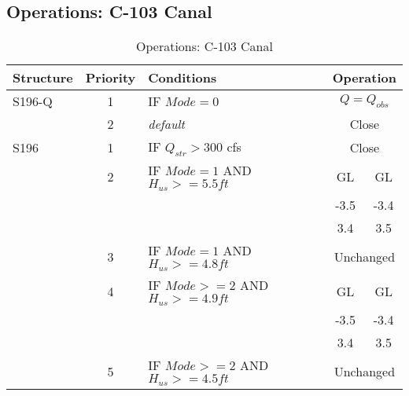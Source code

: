 \clearpage

\subsection{Operations: C-103 Canal}

\scriptsize
\begin{table}[!h]
\centering
\caption{Operations: C-103 Canal}
\label{tab:M11opsC103}
\begin{tabular}{|l|c|l|c|c|}
\hline
\textbf{Structure} & \textbf{Priority}  & \textbf{Conditions} & \multicolumn{2}{|c|}{\textbf{Operation}}   \\
\hline
\hline
S196-Q        &  1  & IF $Mode=0$                   & \multicolumn{2}{|c|}{$Q = Q_{obs}$}   \\
\hline
              &  2  & \it{default}                  & \multicolumn{2}{|c|}{Close}           \\
\hline
\hline
S196          &  1  & IF $Q_{str}>300$ cfs                               & \multicolumn{2}{|c|}{Close}   \\
\hline
              &  2  & IF $Mode=1$ AND $H_{us}>=5.5 ft$                   & GL    & GL   \\
              &     &                                                    & -3.5  & -3.4 \\
              &     &                                                    & 3.4   & 3.5  \\
\hline
              &  3  & IF $Mode=1$ AND $H_{us}>=4.8ft$                    & \multicolumn{2}{|c|}{Unchanged}   \\
\hline
              &  4  & IF $Mode>=2$ AND $H_{us}>=4.9 ft$                  & GL    & GL   \\
              &     &                                                    & -3.5  & -3.4 \\
              &     &                                                    & 3.4   & 3.5  \\
\hline
              &  5  & IF $Mode>=2$ AND $H_{us}>=4.5ft$                   & \multicolumn{2}{|c|}{Unchanged}   \\

\end{tabular}
\end{table}
